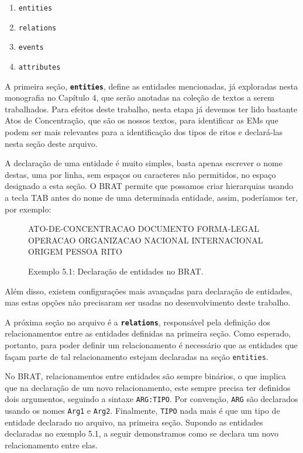 \documentclass[11pt]{report}
\begin{document}
\begin{enumerate}[label={\textbf{\arabic*.}}]
  \item \texttt{entities}
  \item \texttt{relations}
  \item \texttt{events}
  \item \texttt{attributes}
\end{enumerate}

A primeira seção, \textbf{\texttt{entities}}, define as entidades mencionadas, já exploradas nesta monografia no Capítulo 4, que serão anotadas na
coleção de textos a serem trabalhados. Para efeitos deste trabalho, nesta etapa já devemos ter lido bastante Atos de Concentração, que são os nossos textos, para identificar as
EMs que podem ser mais relevantes para a identificação dos tipos de ritos e declará-las nesta seção deste arquivo.

A declaração de uma entidade é muito simples, basta apenas escrever o nome destas, uma por linha, sem espaços ou caracteres não permitidos, no espaço designado a esta seção. O BRAT
permite que possamos criar hierarquias usando a tecla TAB antes do nome de uma determinada entidade, assim, poderíamos ter, por exemplo:

\begin{figure}[h!]
\centering
\begin{boxedverbatim}
[entities]

ATO-DE-CONCENTRACAO
DOCUMENTO
FORMA-LEGAL
OPERACAO
ORGANIZACAO
    NACIONAL
    INTERNACIONAL
ORIGEM
PESSOA
RITO
\end{boxedverbatim}
\caption*{Exemplo 5.1: Declaração de entidades no BRAT.}
\end{figure}

Além disso, existem configurações mais avançadas para declaração de entidades, mas estas opções não precisaram ser usadas no desenvolvimento deste trabalho.

A próxima seção no arquivo é a \textbf{\texttt{relations}}, responsável pela definição dos relacionamentos entre as entidades definidas na primeira seção. Como esperado, portanto,
para poder definir um relacionamento é necessário que as entidades que façam parte de tal relacionamento estejam declaradas na seção \texttt{entities}.

No BRAT, relacionamentos entre entidades são sempre binários, o que implica que na declaração de um novo relacionamento, este sempre precisa ter definidos dois argumentos,
seguindo a sintaxe \texttt{ARG:TIPO}. Por convenção, \texttt{ARG} são declarados usando os nomes \texttt{Arg1} e \texttt{Arg2}. Finalmente, \texttt{TIPO} nada mais é que
um tipo de entidade declarado no arquivo, na primeira seção. Supondo as entidades declaradas no exemplo 5.1, a seguir demonstramos como se declara um novo relacionamento entre elas.
\end{document}
